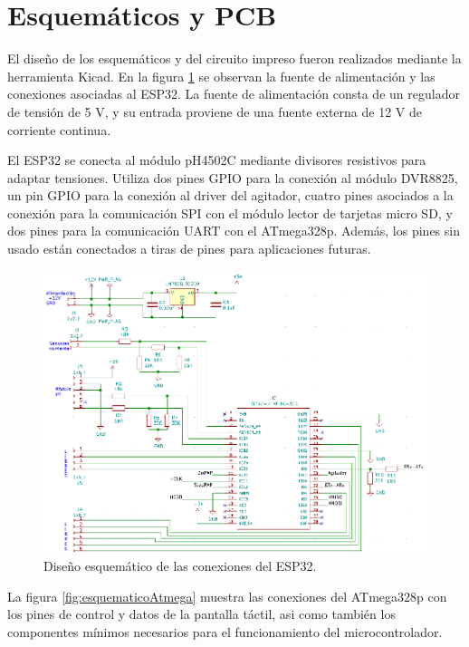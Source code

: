 \section{Esquemáticos y PCB}

El diseño de los esquemáticos y del circuito impreso fueron realizados mediante la herramienta Kicad. En la figura \ref{fig:esquematicoESP} se observan la fuente de alimentación y las conexiones asociadas al ESP32. La fuente de alimentación consta de un regulador de tensión de 5 V, y su entrada proviene de una fuente externa de 12 V de corriente continua.

El ESP32 se conecta al módulo pH4502C mediante divisores resistivos para adaptar tensiones. Utiliza dos pines GPIO para la conexión al módulo DVR8825, un pin GPIO para la conexión al driver del agitador, cuatro pines asociados a la conexión para la comunicación SPI con el módulo lector de tarjetas micro SD, y dos pines para la comunicación UART con el ATmega328p. Además, los pines sin usado están conectados a tiras de pines para aplicaciones futuras.

\begin{figure}[htbp]
	\centering
	\includegraphics[width=1.0\textwidth]{./Figures/esquematicoESP.png}
	\caption{Diseño esquemático de las conexiones del ESP32.}
	\label{fig:esquematicoESP}
\end{figure}

La figura \ref{fig:esquematicoAtmega} muestra las conexiones del ATmega328p con los pines de control y datos de la pantalla táctil, asi como también los componentes mínimos necesarios para el funcionamiento del microcontrolador.

